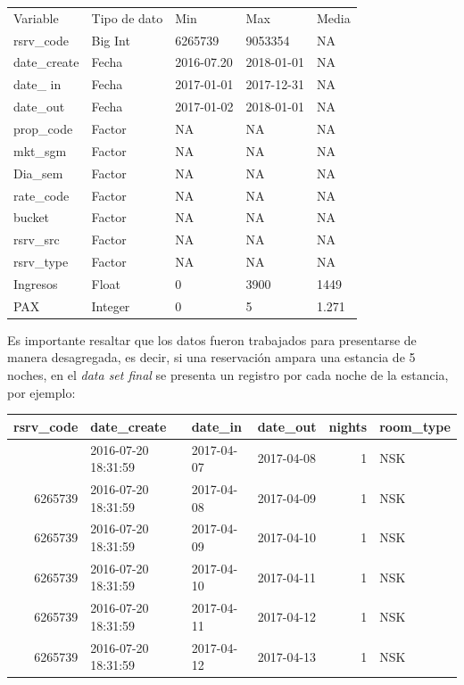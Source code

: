 \begin{table}[H]
\begin{tabular}{lllll}
Variable     & Tipo de dato & Min        & Max        & Media \\
rsrv\_code   & Big Int      & 6265739    & 9053354    & NA    \\
date\_create & Fecha        & 2016-07.20 & 2018-01-01 & NA    \\
date\_ in    & Fecha        & 2017-01-01 & 2017-12-31 & NA    \\
date\_out    & Fecha        & 2017-01-02 & 2018-01-01 & NA    \\
prop\_code   & Factor       & NA         & NA         & NA    \\
mkt\_sgm     & Factor       & NA         & NA         & NA    \\
Dia\_sem     & Factor       & NA         & NA         & NA    \\
rate\_code   & Factor       & NA         & NA         & NA    \\
bucket       & Factor       & NA         & NA         & NA    \\
rsrv\_src    & Factor       & NA         & NA         & NA    \\
rsrv\_type   & Factor       & NA         & NA         & NA    \\
Ingresos     & Float        & 0          & 3900       & 1449  \\
PAX          & Integer      & 0          & 5          & 1.271 \\
\end{tabular}
\end{table}
Es importante resaltar que los datos fueron trabajados para presentarse de manera desagregada, es decir, si una reservación ampara una estancia de 5 noches, en el \emph{data set final} se presenta un registro por cada noche de la estancia, por ejemplo:

\begin{knitrout}
\color{fgcolor}\begin{table}[H]
\centering{}

\begin{tabular}{r|l|l|l|r|l}
\hiderowcolors
\hline
rsrv\_code & date\_create & date\_in & date\_out & nights & room\_type\\
\hline
\showrowcolors
6265739 & 2016-07-20 18:31:59 & 2017-04-07 & 2017-04-08 & 1 & NSK\\
\hline
6265739 & 2016-07-20 18:31:59 & 2017-04-08 & 2017-04-09 & 1 & NSK\\
\hline
6265739 & 2016-07-20 18:31:59 & 2017-04-09 & 2017-04-10 & 1 & NSK\\
\hline
6265739 & 2016-07-20 18:31:59 & 2017-04-10 & 2017-04-11 & 1 & NSK\\
\hline
6265739 & 2016-07-20 18:31:59 & 2017-04-11 & 2017-04-12 & 1 & NSK\\
\hline
6265739 & 2016-07-20 18:31:59 & 2017-04-12 & 2017-04-13 & 1 & NSK\\
\hline
\end{tabular}
\end{table}
\end{knitrout}

